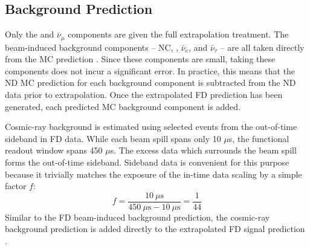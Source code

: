 \subsection{Background Prediction}

Only the \numu and $\bar{\nu}_\mu$ components are given the full extrapolation
treatment.
The beam-induced background components -- NC, \nue, $\bar{\nu}_e$, \nutau and
$\bar{\nu}_\tau$ -- are all taken directly from the MC prediction
\cite{lozier2015extrap}.
Since these components are small, taking these components does not incur
a significant error.
In practice, this means that the ND MC prediction for each background component
is subtracted from the ND data prior to extrapolation.
Once the extrapolated FD prediction has been generated, each predicted MC
background component is added.


Cosmic-ray background is estimated using selected events from the out-of-time
sideband in FD data.
While each \numi beam spill spans only 10 $\mu$s, the functional readout window
spans 450 $\mu$s.
The excess data which surrounds the beam spill forms the out-of-time sideband.
Sideband data is convenient for this purpose because it trivially
matches the exposure of the in-time data scaling by a simple factor $f$:
\begin{equation}
f = \frac{10~\mu\text{s}}{ 450~\mu\text{s} - 10~\mu\text{s}} = \frac{1}{44}
\end{equation}
Similar to the FD beam-induced background prediction, the cosmic-ray
background prediction is added directly to the extrapolated FD signal
prediction \cite{backhouse2015cafana}.


